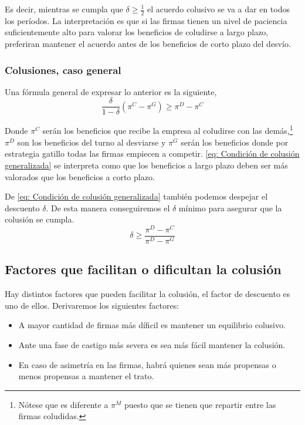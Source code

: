 Es decir, mientras se cumpla que $\delta \geq \frac{1}{2}$ el acuerdo colusivo se va a dar en todos los períodos. La interpretación es que si las firmas tienen un nivel de paciencia suficientemente alto para valorar los beneficios de coludirse a largo plazo, preferiran mantener el acuerdo antes de los beneficios de corto plazo del desvío. 

\subsubsection*{Colusiones, caso general}

Una fórmula general de expresar lo anterior es la siguiente,
\begin{equation}
    \frac{\delta }{1-\delta} (\pi ^C - \pi^{G}) \geq \pi ^D- \pi^C \label{eq: Condición de colusión generalizada}
\end{equation}

Donde $\pi^C$ serán los beneficios que recibe la empresa al coludirse con las demás,\footnote{Nótese que es diferente a $\pi^M$ puesto que se tienen que repartir entre las firmas coludidas.} $\pi^D$ son los beneficios del turno al desviarse y $\pi^G$ serán los beneficios donde por estrategia gatillo todas las firmas empiecen a competir. \ref{eq: Condición de colusión generalizada} se interpreta como que los beneficios a largo plazo deben ser más valorados que los beneficios a corto plazo. 

De \ref{eq: Condición de colusión generalizada} también podemos despejar el descuento $\delta$. De esta manera conseguiremos el $\delta$ mínimo para asegurar que la colusión se cumpla.
\begin{equation}
    \delta \geq \frac{\pi^D - \pi ^C}{\pi^D- \pi^G} \label{eq: Condición Descuento}
\end{equation}

\subsection{Factores que facilitan o dificultan la colusión}

Hay distintos factores que pueden facilitar la colusión, el factor de descuento es uno de ellos. Derivaremos los siguientes factores:
\begin{itemize}
    \item A mayor cantidad de firmas más díficil es mantener un equilibrio colusivo.
    \item Ante una fase de castigo más severa es sea más fácil mantener la colusión.
    \item En caso de asimetría en las firmas, habrá quienes sean más propensas o menos propensas a mantener el trato.
\end{itemize}

